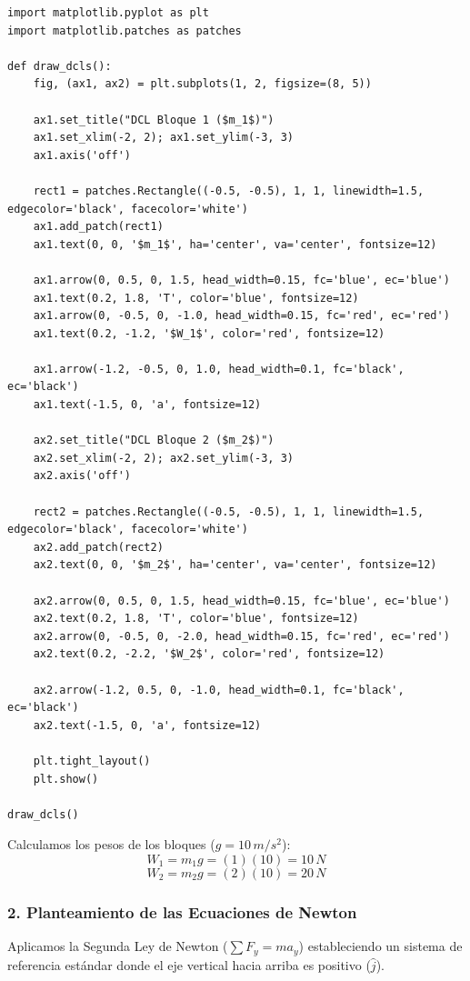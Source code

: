 \documentclass[12pt, a4paper]{article}
\begin{document}
\begin{lstlisting}
import matplotlib.pyplot as plt
import matplotlib.patches as patches

def draw_dcls():
    fig, (ax1, ax2) = plt.subplots(1, 2, figsize=(8, 5))
    
    ax1.set_title("DCL Bloque 1 ($m_1$)")
    ax1.set_xlim(-2, 2); ax1.set_ylim(-3, 3)
    ax1.axis('off')
    
    rect1 = patches.Rectangle((-0.5, -0.5), 1, 1, linewidth=1.5, edgecolor='black', facecolor='white')
    ax1.add_patch(rect1)
    ax1.text(0, 0, '$m_1$', ha='center', va='center', fontsize=12)
    
    ax1.arrow(0, 0.5, 0, 1.5, head_width=0.15, fc='blue', ec='blue')
    ax1.text(0.2, 1.8, 'T', color='blue', fontsize=12)
    ax1.arrow(0, -0.5, 0, -1.0, head_width=0.15, fc='red', ec='red')
    ax1.text(0.2, -1.2, '$W_1$', color='red', fontsize=12)
    
    ax1.arrow(-1.2, -0.5, 0, 1.0, head_width=0.1, fc='black', ec='black')
    ax1.text(-1.5, 0, 'a', fontsize=12)
    
    ax2.set_title("DCL Bloque 2 ($m_2$)")
    ax2.set_xlim(-2, 2); ax2.set_ylim(-3, 3)
    ax2.axis('off')
    
    rect2 = patches.Rectangle((-0.5, -0.5), 1, 1, linewidth=1.5, edgecolor='black', facecolor='white')
    ax2.add_patch(rect2)
    ax2.text(0, 0, '$m_2$', ha='center', va='center', fontsize=12)
    
    ax2.arrow(0, 0.5, 0, 1.5, head_width=0.15, fc='blue', ec='blue')
    ax2.text(0.2, 1.8, 'T', color='blue', fontsize=12)
    ax2.arrow(0, -0.5, 0, -2.0, head_width=0.15, fc='red', ec='red')
    ax2.text(0.2, -2.2, '$W_2$', color='red', fontsize=12)
    
    ax2.arrow(-1.2, 0.5, 0, -1.0, head_width=0.1, fc='black', ec='black')
    ax2.text(-1.5, 0, 'a', fontsize=12)
    
    plt.tight_layout()
    plt.show()

draw_dcls()
\end{lstlisting}

Calculamos los pesos de los bloques ($g = 10 \, \si{m/s^2}$):
$$ W_1 = m_1 g = (1)(10) = 10 \, \si{N} $$
$$ W_2 = m_2 g = (2)(10) = 20 \, \si{N} $$

\subsubsection*{2. Planteamiento de las Ecuaciones de Newton}
Aplicamos la Segunda Ley de Newton ($\sum F_y = m a_y$) estableciendo un sistema de referencia estándar donde el eje vertical hacia arriba es positivo ($\hat{j}$).
\end{document}
